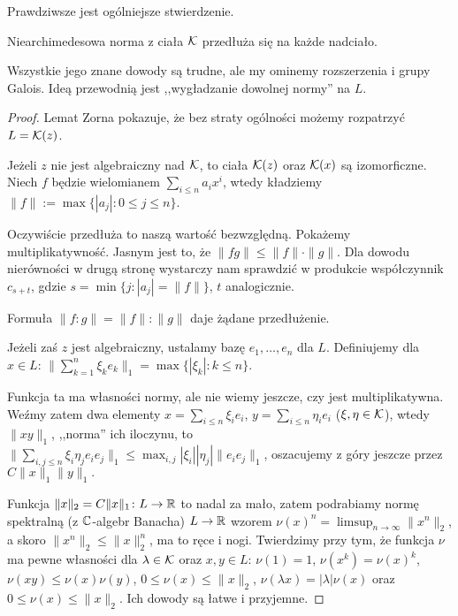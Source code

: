Prawdziwsze jest ogólniejsze stwierdzenie.

\begin{twierdzenie}[Krull]
	Niearchimedesowa norma z ciała $\mathcal K$ przedłuża się na każde nadciało.
\end{twierdzenie}

Wszystkie jego znane dowody są trudne, ale my ominemy rozszerzenia i grupy Galois.
Ideą przewodnią jest ,,wygładzanie dowolnej normy'' na $L$.

\begin{proof}
	Lemat Zorna pokazuje, że bez straty ogólności możemy rozpatrzyć $L = \mathcal K(z)$.

	Jeżeli $z$ nie jest algebraiczny nad $\mathcal K$, to ciała $\mathcal K(z)$ oraz $\mathcal K(x)$ są izomorficzne.
	Niech $f$ będzie wielomianem $\sum_{i\le n} a_i x^i$, wtedy kładziemy $\|f\| := \max \{|a_j| \colon 0 \le j \le n\}$.

	Oczywiście przedłuża to naszą wartość bezwzględną.
	Pokażemy multiplikatywność.
	Jasnym jest to, że $\|fg\| \le \|f\| \cdot \|g\|$.
	Dla dowodu nierówności w drugą stronę wystarczy nam sprawdzić w produkcie współczynnik $c_{s+t}$, gdzie $s = \min \{j : |a_j| = \|f\|\}$, $t$ analogicznie.

	Formuła $\|f:g\| = \|f\|:\|g\|$ daje żądane przedłużenie.

	Jeżeli zaś $z$ jest algebraiczny, ustalamy bazę $e_1, \ldots, e_n$ dla $L$.
	Definiujemy dla $x \in L$: $\| \sum_{k=1}^n \xi_k e_k \|_1 = \max \{|\xi_k| : k \le n\}$.
	
	Funkcja ta ma własności normy, ale nie wiemy jeszcze, czy jest multiplikatywna.
	Weźmy zatem dwa elementy $x = \sum_{i \le n} \xi_i e_i$, $y = \sum_{i \le n} \eta_i e_i$ ($\xi, \eta \in \mathcal K$), wtedy $\|xy\|_1$, ,,norma'' ich iloczynu, to $\|\sum_{i, j \le n} \xi_i \eta_j e_i e_j \|_1 \le \max_{i, j} |\xi_i| |\eta_j| \|e_ie_j\|_1$, oszacujemy z góry jeszcze przez $C \|x\|_1 \|y\|_1.$

	Funkcja $\|x\|_2 = C \|x\|_1 \colon L \to \mathbb R$ to nadal za mało, zatem podrabiamy normę spektralną (z $\mathbb C$-algebr Banacha) $L \to \mathbb R$ wzorem $\nu(x)^n = \limsup_{n \to \infty}\|x^n\|_2$, a skoro $\|x^n\|_2 \le \|x\|_2^n$, ma to ręce i nogi. Twierdzimy przy tym, że funkcja $\nu$ ma pewne własności dla $\lambda \in \mathcal K$ oraz $x, y \in L$: $\nu(1) = 1$, $\nu(x^k) = \nu(x)^k$, $\nu(xy) \le \nu(x) \nu(y)$, $0 \le \nu(x) \le \|x\|_2$, $\nu(\lambda x) = |\lambda| \nu(x)$ oraz $0 \le \nu(x) \le \|x\|_2$.
	Ich dowody są łatwe i przyjemne.


\end{proof}
